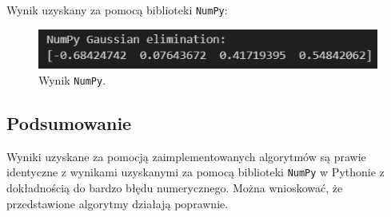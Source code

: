 \documentclass[11pt, leqno]{scrartcl}
\begin{document}
    \subsection*{}
    Wynik uzyskany za pomocą biblioteki \texttt{NumPy}:
    \begin{figure}[H]
        \centering
        \includegraphics[width=0.7\linewidth]{por_gauss_np.png}
        \caption{Wynik \texttt{NumPy}.}
    \end{figure}

    \subsection{Podsumowanie}
    Wyniki uzyskane za pomocją zaimplementowanych algorytmów są
    prawie identyczne z wynikami uzyskanymi za pomocą biblioteki
    \texttt{NumPy} w Pythonie z dokładnością do bardzo błędu
    numerycznego. Można wnioskować, że przedstawione algorytmy
    działają poprawnie.
    
\end{document}
